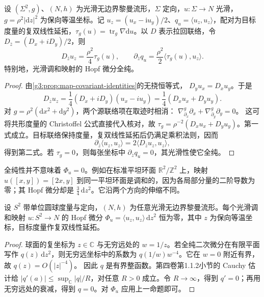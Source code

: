 \begin{proposition}\label{g3:prop:hopf-holomorphic}
	设 \((\Sigma^2,g)\)、\((N,h)\) 为光滑无边界黎曼流形，\(\Sigma\) 定向，\(u:\Sigma\to N\) 光滑，\(g=\rho^2|\mathrm dz|^2\) 为保向等温坐标。记 \(u_z=(u_x-\mathrm i u_y)/2\)、\(q_u=\langle u_z,u_z\rangle\)，配对为目标度量的复双线性延拓，\(\tau_g(u)=\operatorname{tr}_g\nabla\mathrm du\)。以 \(D\) 表示拉回联络，令 \(D_{\bar z}=(D_x+iD_y)/2\)，则
	\begin{equation}\label{g3:eq:hopf-tension}
		D_{\bar z}u_z=\frac{\rho^2}{4}\tau_g(u),\qquad
		\partial_{\bar z}q_u
		=\frac{\rho^2}{2}\langle\tau_g(u),u_z\rangle.
	\end{equation}
	特别地，光滑调和映射的 Hopf 微分全纯。
\end{proposition}
\begin{proof}
	由\cref{g3:prop:map-covariant-identities}的无挠恒等式，
	\(D_yu_x=D_xu_y\)。于是
	\[
		D_{\bar z}u_z
		=\frac14(D_x+iD_y)(u_x-iu_y)
		=\frac14(D_xu_x+D_yu_y).
	\]
	对 \(g=\rho^2(\mathrm dx^2+\mathrm dy^2)\)，两个源联络项在取迹时相消：
	\(\nabla^g_{\partial_x}\partial_x+
	\nabla^g_{\partial_y}\partial_y=0\)。
	这可将共形度量的 Christoffel 公式直接代入核对，故
	\(\tau_g=\rho^{-2}(D_xu_x+D_yu_y)\)。第一式成立。目标联络保持度量，复双线性延拓后仍满足乘积法则，因而
	\[
		\partial_{\bar z}\langle u_z,u_z\rangle
		=2\langle D_{\bar z}u_z,u_z\rangle,
	\]
	得到第二式。若 \(\tau_g=0\)，则每张坐标中
	\(\partial_{\bar z}q_u=0\)，其光滑性使它全纯。
\end{proof}

全纯性并不意味着 \(\Phi_u=0\)。例如在标准平坦环面
\(\mathbb R^2/\mathbb Z^2\) 上，映射
\(u([x,y])=[2x,y]\) 到同一平坦环面是调和的，因为各局部分量的二阶导数为零；其 Hopf 微分却是
\(\frac34\,\mathrm dz^2\)。它沿两个方向的伸缩不同。

\begin{corollary}\label{g3:cor:harmonic-sphere-weak-conformal}
	设 \(S^2\) 带单位圆球度量与定向，\((N,h)\) 为任意光滑无边界黎曼流形。每个光滑调和映射 \(u:S^2\to N\) 的 Hopf 微分 \(\Phi_u=\langle u_z,u_z\rangle\,\mathrm dz^2\) 恒为零，其中 \(z\) 为保向等温坐标，目标度量作复双线性延拓。
\end{corollary}
\begin{proof}
	球面的复坐标为 \(z\in\mathbb C\) 与无穷远处的 \(w=1/z\)。若全纯二次微分在有限平面写作 \(q(z)\,\mathrm dz^2\)，则无穷远坐标中的系数为
	\(q(1/w)w^{-4}\)。它在 \(w=0\) 附近有界，故 \(q(z)=O(|z|^{-4})\)。
	因此 \(q\) 是有界整函数。第四卷第1.1.2小节的 Cauchy 估计给
	\(|q'(a)|\le \sup_{\mathbb C}|q|/R\)，对任意 \(R>0\) 成立。令 \(R\to\infty\)，得到 \(q'=0\)；再用无穷远处的衰减，得到 \(q=0\)。对 \(\Phi_u\) 应用上一命题即可。
\end{proof}

